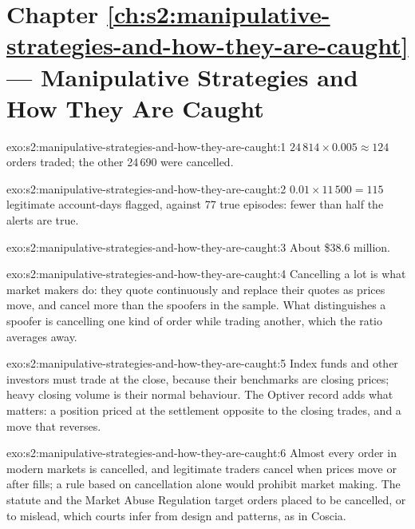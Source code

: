 \section*{Chapter \ref{ch:s2:manipulative-strategies-and-how-they-are-caught} --- Manipulative Strategies and How They Are Caught}

\begin{solution}{exo:s2:manipulative-strategies-and-how-they-are-caught:1}
$24\,814 \times 0.005 \approx 124$ orders traded; the other 24\,690 were cancelled.
\end{solution}

\begin{solution}{exo:s2:manipulative-strategies-and-how-they-are-caught:2}
$0.01 \times 11\,500 = 115$ legitimate account-days flagged, against 77 true episodes: fewer than half the alerts are true.
\end{solution}

\begin{solution}{exo:s2:manipulative-strategies-and-how-they-are-caught:3}
About \$38.6 million.
\end{solution}

\begin{solution}{exo:s2:manipulative-strategies-and-how-they-are-caught:4}
Cancelling a lot is what market makers do: they quote continuously and replace their quotes as prices move, and cancel more than the spoofers in the
sample. What distinguishes a spoofer is cancelling one kind of order while trading another, which the ratio averages away.
\end{solution}

\begin{solution}{exo:s2:manipulative-strategies-and-how-they-are-caught:5}
Index funds and other investors must trade at the close, because their benchmarks are closing prices; heavy closing volume is their normal
behaviour. The Optiver record adds what matters: a position priced at the settlement opposite to the closing trades, and a move that reverses.
\end{solution}

\begin{solution}{exo:s2:manipulative-strategies-and-how-they-are-caught:6}
Almost every order in modern markets is cancelled, and legitimate traders cancel when prices move or after fills; a rule based on cancellation alone
would prohibit market making. The statute and the Market Abuse Regulation target orders placed to be cancelled, or to mislead, which courts infer
from design and patterns, as in Coscia.
\end{solution}

